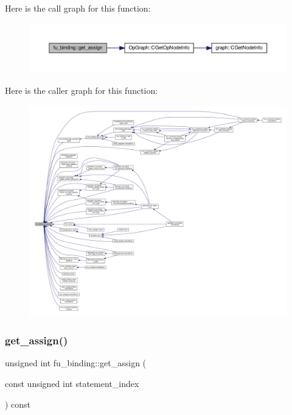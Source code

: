 Here is the call graph for this function\+:
\nopagebreak
\begin{figure}[H]
\begin{center}
\leavevmode
\includegraphics[width=350pt]{d8/d04/classfu__binding_af7ec91c33961d791fc2b977fd3b119bd_cgraph}
\end{center}
\end{figure}
Here is the caller graph for this function\+:
\nopagebreak
\begin{figure}[H]
\begin{center}
\leavevmode
\includegraphics[width=350pt]{d8/d04/classfu__binding_af7ec91c33961d791fc2b977fd3b119bd_icgraph}
\end{center}
\end{figure}
\mbox{\label{classfu__binding_af9092917389748eb9d98bd7eac24a116}} 
\subsubsection{\texorpdfstring{get\+\_\+assign()}{get\_assign()}\hspace{0.1cm}{\footnotesize\ttfamily [2/2]}}
{\footnotesize\ttfamily unsigned int fu\+\_\+binding\+::get\+\_\+assign (\begin{DoxyParamCaption}\item[{const unsigned int}]{statement\+\_\+index }\end{DoxyParamCaption}) const}



